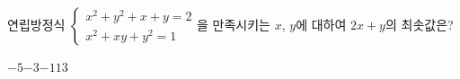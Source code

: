 연립방정식 $\begin{cases} x^2+y^2+x+y=2 \\ x^2+xy+y^2=1 \end{cases}$을 만족시키는 $x$, $y$에 대하여 $2x+y$의 최솟값은?
\begin{choices32}{$-5$}{$-3$}{$-1$}{$1$}{$3$}\end{choices32}
